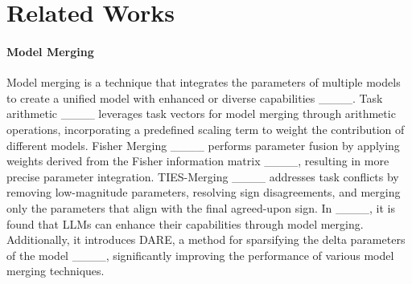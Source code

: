 \section{Related Works}
\paragraph{\textbf{{Model Merging}}}
Model merging is a technique that integrates the parameters of multiple models to create a unified model with enhanced or diverse capabilities ____. 
Task arithmetic ____ leverages task vectors for model merging through arithmetic operations, incorporating a predefined scaling term to weight the contribution of different models.
Fisher Merging ____ performs parameter fusion by applying weights derived from the Fisher information matrix ____, resulting in more precise parameter integration.
TIES-Merging ____ addresses task conflicts by removing low-magnitude parameters, resolving sign disagreements, and merging only the parameters that align with the final agreed-upon sign.
In ____, it is found that LLMs can enhance their capabilities through model merging. Additionally, it introduces DARE, a method for sparsifying the delta parameters of the model ____, significantly improving the performance of various model merging techniques. 

